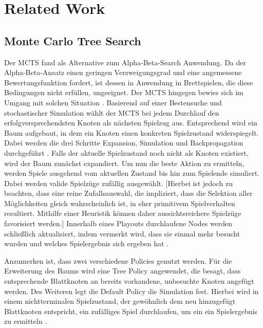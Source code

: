 \documentclass[12pt,a4paper]{article}
\begin{document}
 


\newpage

\section{Related Work}

\subsection{Monte Carlo Tree Search}
Der MCTS fand als Alternative zum Alpha-Beta-Search Anwendung. Da der Alpha-Beta-Ansatz einen geringen Verzweigungsgrad und eine angemessene Bewertungsfunktion fordert, ist dessen in Anwendung in Brettspielen, die diese Bedingungen nicht erfüllen, ungeeignet. Der MCTS hingegen bewies sich im Umgang mit solchen Situation \cite{Chaslot2008}.
Basierend auf einer Bestensuche und stochastischer Simulation \cite{Chaslot2008} wählt der MCTS bei jedem Durchlauf den erfolgversprechendsten Knoten als nächsten Spielzug aus. Entsprechend wird ein Baum aufgebaut, in dem ein Knoten einen konkreten Spielzustand widerspiegelt. Dabei werden die drei Schritte Expansion, Simulation und Backpropagation durchgeführt \cite{Chaslot2008}. Falls der aktuelle Spielzustand noch nicht als Knoten existiert, wird der Baum zunächst expandiert. Um nun die beste Aktion zu ermitteln, werden Spiele ausgehend vom aktuellen Zustand bis hin zum Spielende simuliert. Dabei werden valide Spielzüge zufällig ausgewählt. [Hierbei ist jedoch zu beachten, dass eine reine Zufallsauswahl, die impliziert, dass die Selektion aller Möglichkeiten gleich wahrscheinlich ist, in eher primitivem Spielverhalten resultiert. Mithilfe einer Heuristik können daher aussichtsreichere Spielzüge favorisiert werden.] Innerhalb eines Playouts durchlaufene Nodes werden schließlich aktualisiert, indem vermerkt wird, dass sie einmal mehr besucht wurden und welches Spielergebnis sich ergeben hat \cite{Chaslot2008}. 

Anzumerken ist, dass zwei verschiedene Policies genutzt werden. Für die Erweiterung des Baums wird eine Tree Policy angewendet, die besagt, dass entsprechende Blattknoten an bereits vorhandene, unbesuchte Knoten angefügt werden. Des Weiteren legt die Default Policy die Simulation fest. Hierbei wird in einem nichtterminalen Spielzustand, der gewöhnlich dem neu hinzugefügt Blattknoten entspricht, ein zufälliges Spiel durchlaufen, um ein ein Spielergebnis zu ermitteln \cite{Browne2012}. 
\end{document}
